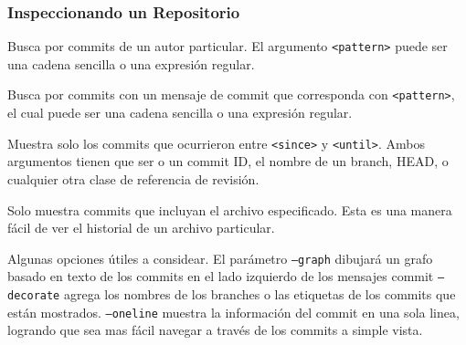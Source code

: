 \documentclass[8pt]{beamer}
\begin{document}
\begin{frame}
\frametitle{Inspeccionando un Repositorio}

Busca por commits de un autor particular. El argumento \texttt{<pattern>} puede ser una cadena sencilla o una expresi\'on regular.

Busca por commits con un mensaje de commit que corresponda con \texttt{<pattern>}, el cual puede ser una cadena sencilla o una expresi\'on regular.

Muestra solo los commits que ocurrieron entre \texttt{<since>} y \texttt{<until>}. Ambos argumentos tienen que ser o un commit ID, el nombre de un branch, HEAD, o cualquier otra clase de referencia de revisi\'on.

Solo muestra commits que incluyan el archivo especificado. Esta es una manera f\'acil de ver el historial de un archivo particular.

Algunas opciones \'utiles a considear. El par\'ametro \texttt{--graph} dibujar\'a un grafo basado en texto de los commits en el lado izquierdo de los mensajes commit \texttt{--decorate} agrega los nombres de los branches o las etiquetas de los commits que est\'an mostrados. \texttt{--oneline} muestra la informaci\'on del commit en una sola linea, logrando que sea mas f\'acil navegar a trav\'es de los commits a simple vista.
\end{frame}
\end{document}
